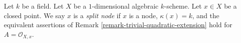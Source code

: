 \begin{definition}
\label{definition-split-node}
Let $k$ be a field. Let $X$ be a $1$-dimensional algebraic $k$-scheme.
Let $x \in X$ be a closed point. We say $x$ is a {\it split node}
if $x$ is a node, $\kappa(x) = k$, and the equivalent assertions of
Remark \ref{remark-trivial-quadratic-extension}
hold for $A = \mathcal{O}_{X, x}$.
\end{definition}